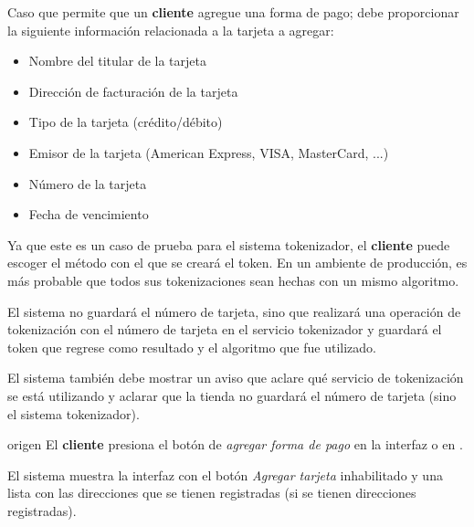 %
%

{
  Caso que permite que un \textbf{cliente} agregue una forma de pago; debe
  proporcionar la siguiente información relacionada a la tarjeta a agregar:
  \begin{itemize}
    \item Nombre del titular de la tarjeta
    \item Dirección de facturación de la tarjeta
    \item Tipo de la tarjeta (crédito/débito)
    \item Emisor de la tarjeta (American Express, VISA, MasterCard, ...)
    \item Número de la tarjeta
    \item Fecha de vencimiento
  \end{itemize}

  \begin{hangparas}{2em}{0}
    Ya que este es un caso de prueba para el sistema tokenizador, el
    \textbf{cliente} puede escoger el método con el que se creará el token.
    En un ambiente de producción, es más probable que todos sus tokenizaciones
    sean hechas con un mismo algoritmo.

    El sistema no guardará el número de tarjeta, sino que realizará una
    operación de tokenización con el número de tarjeta en el servicio tokenizador
    y guardará el token que regrese como resultado y el algoritmo que fue
    utilizado.

    El sistema también debe mostrar un aviso que aclare qué servicio de
    tokenización se está utilizando y aclarar que la tienda no guardará el
    número de tarjeta (sino el sistema tokenizador).
  \end{hangparas}

  \begin{trayectoriaPrincipal}

    \item[origen] El \textbf{cliente} presiona el botón de
      \textit{agregar forma de pago} en la interfaz
       o en
      .

    \item El sistema muestra la interfaz
       con el botón
      \textit{Agregar tarjeta} inhabilitado y una lista con las direcciones
      que se tienen registradas (si se tienen direcciones registradas).


\end{trayectoriaPrincipal}}
